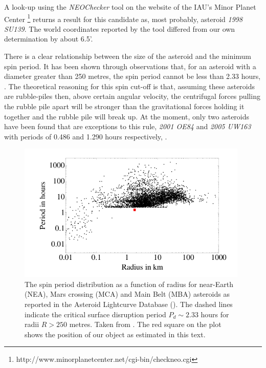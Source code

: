 A look-up using the \emph{NEOChecker} tool on the website of the IAU's Minor Planet Center \footnote{http://www.minorplanetcenter.net/cgi-bin/checkneo.cgi} returns a result for this candidate as, most probably, asteroid \emph{1998 SU139}. The world coordinates reported by the tool differed from our own determination by about 6.5'. 

There is a clear relationship between the size of the asteroid and the minimum spin period. It has been shown through observations that, for an asteroid with a diameter greater than 250 metres, the spin period cannot be less than 2.33 hours, \citep{Jacobson2014}. The theoretical reasoning for this spin cut-off is that, assuming these asteroids are rubble-piles then, above certain angular velocity, the centrifugal forces pulling the rubble pile apart will be stronger than the gravitational forces holding it together and the rubble pile will break up. At the moment, only two asteroids have been found that are exceptions to this rule, \emph{2001 OE84} and \emph{2005 UW163} with periods of 0.486 and 1.290 hours respectively, \citep{Chang2014}. 

  \begin{figure}
    \center
    \includegraphics[width=110mm]{images/jacobson-asteroid-rotation-dot.png} 
    \caption{The spin period distribution as a function of radius for near-Earth (NEA), Mars crossing (MCA) and Main Belt (MBA) asteroids as reported in the Asteroid Lightcurve Database (\cite{2009Icar..202..134W}). The dashed lines indicate the critical surface disruption period $P_d \sim 2.33$ hours for radii $R > 250$ metres. Taken from \cite{Jacobson2014}. The red square on the plot shows the position of our object as estimated in this text.}
    \label{fig:spinrotationcutoff}
  \end{figure}
  

